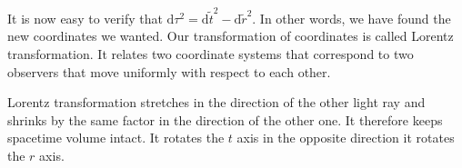 \documentclass[11pt,oneside%
]{memoir}
\newenvironment{eqna}{\begin{IEEEeqnarray*}{c}}{\end{IEEEeqnarray*}\ignorespacesafterend}
\newcommand{\andd}{\qquad\textrm{and}\qquad}
\newcommand{\dd}{\mathrm{d}}
\begin{document}
It is now easy to verify that \(\dd\tau^2=\dd\tilde{t}^2-\dd\tilde{r}^2\). In other words, we have found the new coordinates we wanted. Our transformation of coordinates is called Lorentz transformation. It relates two coordinate systems that correspond to two observers that move uniformly with respect to each other.


Lorentz transformation stretches in the direction of the other light ray and shrinks by the same factor in the direction of the other one. It therefore keeps spacetime volume intact. It rotates the \(t\) axis in the opposite direction it rotates the \(r\) axis.


\end{document}
